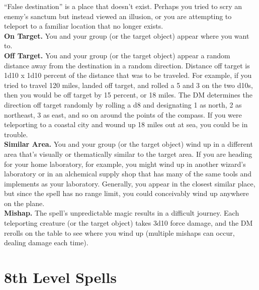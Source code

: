 \documentclass[11pt, A4paper, english]{article}
\begin{document}
“False destination” is a place that doesn’t exist. Perhaps you tried to scry an enemy’s sanctum but instead viewed an illusion, or you are attempting to teleport to a familiar location that no longer exists. \\
\textbf{On Target.} You and your group (or the target object) appear where you want to. \\
\textbf{Off Target.} You and your group (or the target object) appear a random distance away from the destination in a random direction. Distance off target is 1d10 x 1d10 percent of the distance that was to be traveled. For example, if you tried to travel 120 miles, landed off target, and rolled a 5 and 3 on the two d10s, then you would be off target by 15 percent, or 18 miles. The DM determines the direction off target randomly by rolling a d8 and designating 1 as north, 2 as northeast, 3 as east, and so on around the points of the compass. If you were teleporting to a coastal city and wound up 18 miles out at sea, you could be in trouble. \\
\textbf{Similar Area.} You and your group (or the target object) wind up in a different area that’s visually or thematically similar to the target area. If you are heading for your home laboratory, for example, you might wind up in another wizard’s laboratory or in an alchemical supply shop that has many of the same tools and implements as your laboratory. Generally, you appear in the closest similar place, but since the spell has no range limit, you could conceivably wind up anywhere on the plane. \\
\textbf{Mishap.} The spell’s unpredictable magic results in a difficult journey. Each teleporting creature (or the target object) takes 3d10 force damage, and the DM rerolls on the table to see where you wind up (multiple mishaps can occur, dealing damage each time).



	\section{8th Level Spells}
\end{document}
